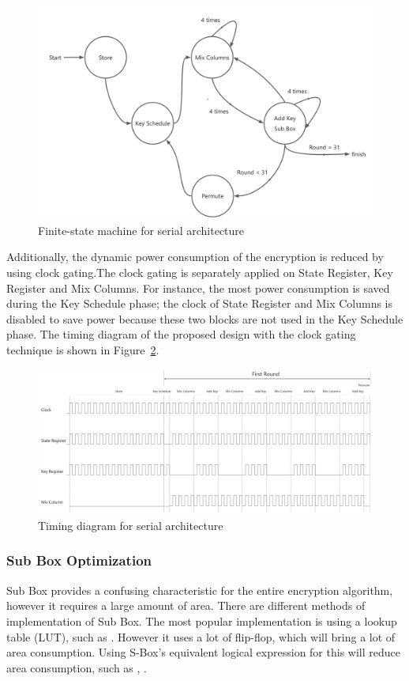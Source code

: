 \documentclass[sn-basic]{sn-jnl}%
\begin{document}
\begin{figure}[h]%
    \caption{Finite-state machine for serial architecture}\label{fig4}
    \centering
    \includegraphics[width=\textwidth]{serial_fsm.png}
\end{figure}

Additionally, the dynamic power consumption of the encryption is reduced by using clock gating.The clock gating is separately applied on State Register, Key Register and Mix Columns. For instance, the most power consumption is saved during the Key Schedule phase; the clock of State Register and Mix Columns is disabled to save power because these two blocks are not used in the Key Schedule phase. The timing diagram of the proposed design with the clock gating technique is shown in Figure~\ref{fig5}.

\begin{figure}[h]%
    \caption{Timing diagram for serial architecture}\label{fig5}
    \centering
    \includegraphics[width=\textwidth]{serial_time.png}
\end{figure}

\subsubsection{Sub Box Optimization }\label{subsubsec1}
Sub Box provides a confusing characteristic for the entire encryption algorithm, however it requires a large amount of area. There are different methods of implementation of Sub Box. The most popular implementation is using a lookup table (LUT), such as \cite{bib17}. However it uses a lot of flip-flop, which will bring a lot of area consumption. Using S-Box's equivalent logical expression for this will reduce area consumption, such as \cite{bib15}, \cite{bib16}.
\end{document}
